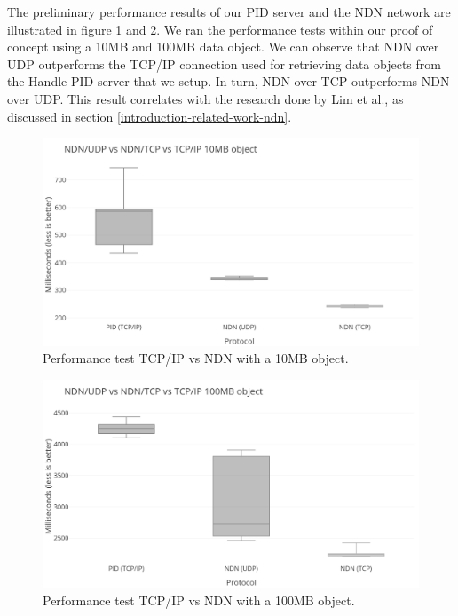 The preliminary performance results of our PID server and the NDN network are illustrated in figure \ref{fig:perftest-1} and \ref{fig:perftest-2}. 
We ran the performance tests within our proof of concept using a 10MB and 100MB data object. We can observe that NDN over UDP outperforms the TCP/IP connection used for retrieving data objects from the Handle PID server that we setup. In turn, NDN over TCP outperforms NDN over UDP. This result correlates with the research done by Lim et al., as discussed in section \ref{introduction-related-work-ndn}. %

\begin{figure}[H]
\centering
\includegraphics[scale=0.43]{Images/bench10MB_grey.png}
\caption{Performance test TCP/IP vs NDN with a 10MB object.}
\label{fig:perftest-1}
\end{figure}

\begin{figure}[H]
\centering
\includegraphics[scale=0.43]{Images/bench100MB_grey.png}
\caption{Performance test TCP/IP vs NDN with a 100MB object.}
\label{fig:perftest-2}
\end{figure}




